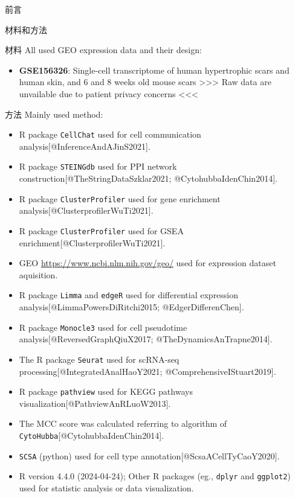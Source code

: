 \documentclass[
  ignorenonframetext,
]{beamer}
\providecommand{\tightlist}{%
  \setlength{\itemsep}{0pt}\setlength{\parskip}{0pt}}
\begin{document}
\begin{frame}{前言}
\protect\hypertarget{introduction}{}
\end{frame}

\begin{frame}[fragile]{材料和方法}
\protect\hypertarget{methods}{}
\begin{block}{材料}
\protect\hypertarget{ux6750ux6599}{}
All used GEO expression data and their design:

\begin{itemize}
\tightlist
\item
  \textbf{GSE156326}: Single-cell transcriptome of human hypertrophic
  scars and human skin, and 6 and 8 weeks old mouse scars
  \textgreater\textgreater\textgreater{} Raw data are unvailable due to
  patient privacy concerns \textless\textless\textless{}
\end{itemize}
\end{block}

\begin{block}{方法}
\protect\hypertarget{ux65b9ux6cd5}{}
Mainly used method:

\begin{itemize}
\tightlist
\item
  R package \texttt{CellChat} used for cell communication
  analysis{[}@InferenceAndAJinS2021{]}.
\item
  R package \texttt{STEINGdb} used for PPI network
  construction{[}@TheStringDataSzklar2021; @CytohubbaIdenChin2014{]}.
\item
  R package \texttt{ClusterProfiler} used for gene enrichment
  analysis{[}@ClusterprofilerWuTi2021{]}.
\item
  R package \texttt{ClusterProfiler} used for GSEA
  enrichment{[}@ClusterprofilerWuTi2021{]}.
\item
  GEO \url{https://www.ncbi.nlm.nih.gov/geo/} used for expression
  dataset aquisition.
\item
  R package \texttt{Limma} and \texttt{edgeR} used for differential
  expression analysis{[}@LimmaPowersDiRitchi2015; @EdgerDifferenChen{]}.
\item
  R package \texttt{Monocle3} used for cell pseudotime
  analysis{[}@ReversedGraphQiuX2017; @TheDynamicsAnTrapne2014{]}.
\item
  The R package \texttt{Seurat} used for scRNA-seq
  processing{[}@IntegratedAnalHaoY2021; @ComprehensiveIStuart2019{]}.
\item
  R package \texttt{pathview} used for KEGG pathways
  visualization{[}@PathviewAnRLuoW2013{]}.
\item
  The MCC score was calculated referring to algorithm of
  \texttt{CytoHubba}{[}@CytohubbaIdenChin2014{]}.
\item
  \texttt{SCSA} (python) used for cell type
  annotation{[}@ScsaACellTyCaoY2020{]}.
\item
  R version 4.4.0 (2024-04-24); Other R packages (eg., \texttt{dplyr}
  and \texttt{ggplot2}) used for statistic analysis or data
  visualization.
\end{itemize}
\end{block}
\end{frame}
\end{document}

